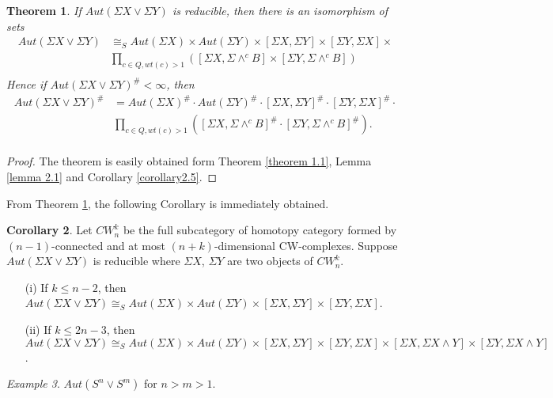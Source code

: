 \documentclass[12pt]{article}
\theoremstyle{theorem}
\newtheorem{theorem}{Theorem}[section]
\theoremstyle{definition}
\theoremstyle{proposition}
\theoremstyle{corollary}
\newtheorem{corollary}[theorem]{Corollary}
\theoremstyle{lemma}
\theoremstyle{remark}
\theoremstyle{example}
\newtheorem{example}[theorem]{Example}
\begin{document}
{\begin{theorem}\label{theorem 2.6}
 If $Aut(\Sigma X\vee \Sigma Y)$ is reducible, then there is an isomorphism of sets
  $$
     \begin{array}{rl}
        Aut(\Sigma X\vee \Sigma Y) & \cong_{S}Aut(\Sigma X)\times Aut(\Sigma Y)\times [\Sigma X, \Sigma Y]\times [\Sigma Y, \Sigma X]\times \\
        &  \prod\limits_{c\in Q, wt(c)>1}([\Sigma X, \Sigma \wedge^{c}B]\times [\Sigma Y, \Sigma \wedge^{c}B]) \\
      \end{array}
     $$
   Hence  if $Aut(\Sigma X\vee \Sigma Y)^{\#}<\infty$, then
 $$   \begin{array}{rl}
        Aut(\Sigma X\vee \Sigma Y)^{\#} &=Aut(\Sigma X)^{\#}\cdot Aut(\Sigma Y)^{\#}\cdot[\Sigma X, \Sigma Y]^{\#}\cdot [\Sigma Y, \Sigma X]^{\#}\cdot \\
        &  \prod\limits_{c\in Q, wt(c)>1}([\Sigma X, \Sigma \wedge^{c}B]^{\#}\cdot [\Sigma Y, \Sigma \wedge^{c}B]^{\#}). \\
      \end{array}  $$
\end{theorem}
\begin{proof}
The theorem is easily obtained form Theorem \ref{theorem 1.1}, Lemma \ref{lemma 2.1} and Corollary \ref{corollary2.5}.
\end{proof}

 From Theorem \ref{theorem 2.6}, the following Corollary is immediately obtained.
 \begin{corollary}\label{corollary 2.7}
Let $CW^{k}_{n}$ be the full subcategory of homotopy category formed by $(n-1)$-connected and at
most $(n+k)$-dimensional CW-complexes. Suppose $ Aut(\Sigma X\vee \Sigma Y)$ is reducible where $\Sigma X$, $\Sigma Y$ are two objects of $CW^{k}_{n}$.
\begin{itemize}
  \item [(i)] If $k\leq n-2$, then $ Aut(\Sigma X\vee \Sigma Y)\cong_{S}Aut(\Sigma X)\times Aut(\Sigma Y)\times [\Sigma X, \Sigma Y]\times[\Sigma Y, \Sigma X]$.
  \item [(ii)]If  $k\leq 2n-3$, then $ Aut(\Sigma X\vee \Sigma Y)\cong_{S}Aut(\Sigma X)\times Aut(\Sigma Y)\times [\Sigma X, \Sigma Y]\times[\Sigma Y, \Sigma X]\times[\Sigma X, \Sigma X\wedge Y]\times[\Sigma Y, \Sigma X\wedge Y]$.
 \end{itemize}
\end{corollary}

\begin{example}\label{example2.8}
  $ Aut(S^{n}\vee S^{m})$ for $n>m>1$.


\end{example}}
\end{document}
